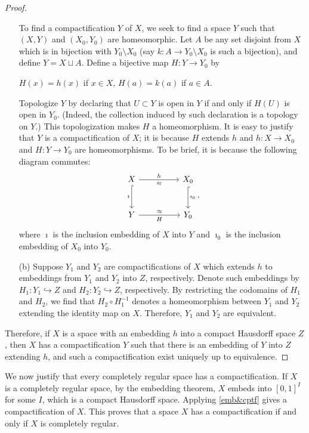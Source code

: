 \begin{proof}
\begin{enumerate}
{            To find a compactification $Y$ of $X$, we seek to find a space $Y$ such that $(X, Y)$ and $(X_0, Y_0)$ are homeomorphic.
            Let $A$ be any set disjoint from $X$ which is in bijection with $Y_0\setminus X_0$ (say $k: A\rightarrow Y_0\setminus X_0$ is such a bijection), and define $Y=X\sqcup A$.
            Define a bijective map $H: Y\rightarrow Y_0$ by
            \begin{center}
                $H(x)=h(x)$ if $x\in X$, $H(a)=k(a)$ if $a\in A$.
            \end{center}
            Topologize $Y$ by declaring that $U\subset Y$ is open in $Y$ if and only if $H(U)$ is open in $Y_0$. (Indeed, the collection induced by such declaration is a topology on $Y$.)
            This topologization makes $H$ a homeomorphism.
            It is easy to justify that $Y$ is a compactification of $X$; it is because $H$ extends $h$ and $h: X\rightarrow X_0$ and $H: Y\rightarrow Y_0$ are homeomorphisms.
            To be brief, it is because the following diagram commutes:
            \begin{equation*}
                \begin{tikzcd}[row sep=large, column sep=huge]
                    X\arrow[r, "h", "\approx"']\arrow[d, "\imath"', hook]
                    &
                    X_0\arrow[d, "\imath_0", hook]\\
                    Y\arrow[r, "\approx", "H"'] & Y_0
                \end{tikzcd},
            \end{equation*}
            where $\imath$ is the inclusion embedding of $X$ into $Y$ and $\imath_0$ is the inclusion embedding of $X_0$ into $Y_0$.
        }
        \item[(b)]
        {
            Suppose $Y_1$ and $Y_2$ are compactifications of $X$ which extends $h$ to embeddings from $Y_1$ and $Y_2$ into $Z$, respectively.
            Denote such embeddings by $H_1: Y_1\hookrightarrow Z$ and $H_2: Y_2\hookrightarrow Z$, respectively.
            By restricting the codomains of $H_1$ and $H_2$, we find that $H_2\circ H_1^{-1}$ denotes a homeomorphism between $Y_1$ and $Y_2$ extending the identity map on $X$.
            Therefore, $Y_1$ and $Y_2$ are equivalent.
        }
    \end{enumerate}
    Therefore, if $X$ is a space with an embedding $h$ into a compact Hausdorff space $Z$, then $X$ has a compactification $Y$ such that there is an embedding of $Y$ into $Z$ extending $h$, and such a compactification exist uniquely up to equivalence.
\end{proof}
\begin{rmk}
    We now justify that every completely regular space has a compactification.
    If $X$ is a completely regular space, by the embedding theorem, $X$ embeds into $[0, 1]^I$ for some $I$, which is a compact Hausdorff space.
    Applying \cref{emb&cptf} gives a compactification of $X$.
    This proves that a space $X$ has a compactification if and only if $X$ is completely regular.
\end{rmk}
